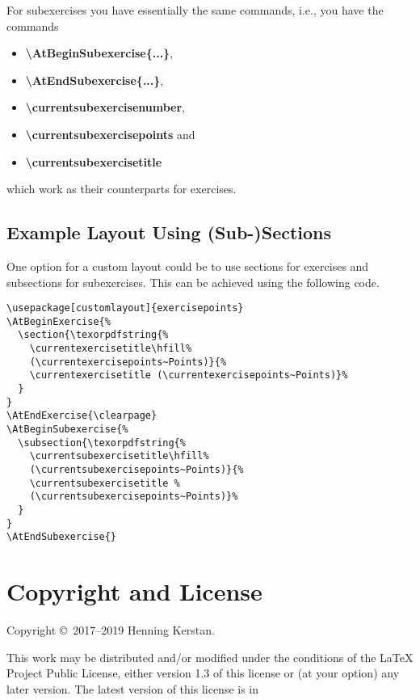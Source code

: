 \documentclass[
  twocolumn,%
  fontsize=9pt,%
  DIV=calc,%
  numbers=noendperiod%
]{scrartcl}
\begin{document}
\noindent For subexercises you have essentially the same commands, i.e., you have the commands 
\begin{itemize}
\item \textcolor{NavyBlue}{\ttfamily\bfseries\textbackslash AtBeginSubexercise\{...\}},
\item \textcolor{NavyBlue}{\ttfamily\bfseries\textbackslash AtEndSubexercise\{...\}}, 
\item \textcolor{NavyBlue}{\ttfamily\bfseries\textbackslash currentsubexercisenumber}, 
\item \textcolor{NavyBlue}{\ttfamily\bfseries\textbackslash currentsubexercisepoints} and 
\item \textcolor{NavyBlue}{\ttfamily\bfseries\textbackslash currentsubexercisetitle}
\end{itemize}
which work as their counterparts for exercises.

\subsection{Example Layout Using (Sub-)Sections}
One option for a custom layout could be to use sections for exercises and subsections for subexercises. This can be achieved using the following code.

\begin{lstlisting}
\usepackage[customlayout]{exercisepoints}
\AtBeginExercise{%
  \section{\texorpdfstring{%
    \currentexercisetitle\hfill%
    (\currentexercisepoints~Points)}{%
    \currentexercisetitle (\currentexercisepoints~Points)}%
  }
}
\AtEndExercise{\clearpage}
\AtBeginSubexercise{%
  \subsection{\texorpdfstring{%
    \currentsubexercisetitle\hfill%
    (\currentsubexercisepoints~Points)}{%
    \currentsubexercisetitle %
    (\currentsubexercisepoints~Points)}%
  }
}
\AtEndSubexercise{}
\end{lstlisting}

\section{Copyright and License}
Copyright \copyright\ 2017--2019 Henning Kerstan.\medskip

\noindent This work may be distributed and/or modified under the conditions of the LaTeX Project Public License, either version 1.3 of this license or (at your option) any later version. The latest version of this license is in\medskip
\end{document}
